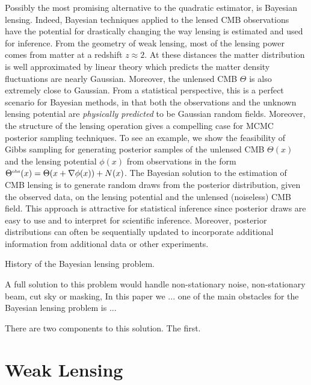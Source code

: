 \documentclass[11pt]{article}
\begin{document}
Possibly the most promising alternative to the quadratic estimator, is Bayesian lensing. Indeed, Bayesian techniques applied to the lensed CMB observations have the potential for drastically changing the way lensing is estimated and used for inference. From the geometry of weak lensing, most of the lensing power comes from matter at a redshift $z\approx 2$. At these distances the matter distribution is well approximated by linear theory which predicts the matter density fluctuations are nearly Gaussian. Moreover, the unlensed CMB $\Theta$ is also extremely close to Gaussian.  From a statistical perspective, this is a perfect scenario for Bayesian methods, in that both the observations and the unknown lensing potential are {\em physically predicted} to be Gaussian random fields. 
 Moreover, the structure of the lensing operation gives a compelling case for MCMC posterior sampling techniques.
 To see an example, we show the feasibility of Gibbs sampling for generating posterior samples of the unlensed CMB $\Theta(x)$  and the lensing potential $\phi(x)$ from observations in the form $\Theta^\text{\tiny obs}(x) = \Theta(x+\nabla \phi(x))+ N(x)$.  
The Bayesian solution to the estimation of CMB lensing  is to generate random draws from the posterior distribution, given the observed data, on the lensing potential and the unlensed (noiseless) CMB field. This approach is attractive for statistical inference since posterior draws are easy to use and to interpret for scientific inference. Moreover, posterior distributions can often be sequentially updated to incorporate additional information from additional data or other experiments.

History of the Bayesian lensing problem.

A full solution to this problem would handle non-stationary noise, non-stationary beam, cut sky or masking, In this paper we ... one of the main obstacles for the Bayesian lensing problem is ...

There are two components to this solution. The first.

\section{Weak Lensing}
\end{document}
